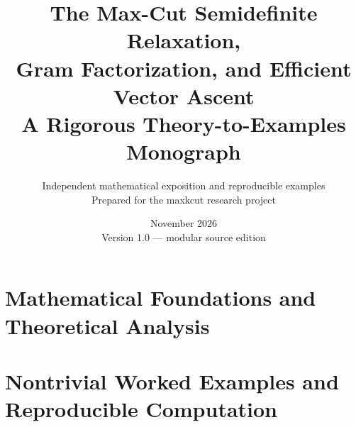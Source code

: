 \documentclass[11pt,oneside]{book}
\title{\Huge\bfseries The Max-Cut Semidefinite Relaxation,\\[.4em] Gram Factorization, and Efficient Vector Ascent\\[.6em]\Large A Rigorous Theory-to-Examples Monograph}
\author{Independent mathematical exposition and reproducible examples\\[.3em]\normalsize Prepared for the maxkcut research project}
\date{November 2026\\\small Version 1.0 --- modular source edition}
\numberwithin{equation}{chapter}
\begin{document}
\frontmatter\maketitle

\tableofcontents
\mainmatter
\part{Mathematical Foundations and Theoretical Analysis}












\part{Nontrivial Worked Examples and Reproducible Computation}





\appendix

\backmatter

\end{document}
